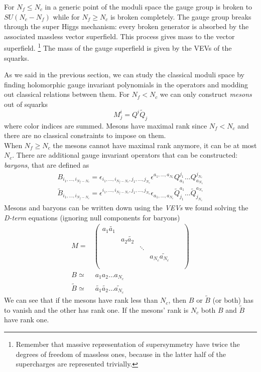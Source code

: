 For $N_f \le N_c$ in a generic point of the moduli space the gauge group is broken to $SU(N_c - N_f)$ while for $N_f \geq N_c$ is broken completely.
The gauge group breaks through the super Higgs mechanism: every broken generator is absorbed by the associated massless vector superfield.
This process gives mass to the vector superfield.  
\footnote{Remember that massive representation of supersymmetry have twice the degrees of freedom of massless ones, because in the latter half of the supercharges are represented trivially.}
The mass of the gauge superfield is given by the VEVs of the squarks.

As we said in the previous section, we can  study the classical moduli space by finding holomorphic gauge invariant polynomials in the operators and modding out classical relations between them.
For $N_f < N_c$ we can only construct \emph{mesons} out of squarks
\begin{equation}
  M^i_j = Q^i \tilde{Q}_j
 \end{equation} 
where color indices are summed. 
Mesons have maximal rank since $N_f < N_c$ and there are no  classical constraints to impose on them. \\
When $N_f \geq N_c$ the mesons cannot have maximal rank anymore, it can be at most $N_c$.
There are additional gauge invariant operators that can be constructed: \emph{baryons}, that are defined as
\begin{align}
 B_{ i_1, \dotsc, i_{N_f - N_c}} = \epsilon_{i_1, \dotsc, i_{N_f - N_c}, j_1 ,\dotsc, j_{N_c}} \epsilon^{a_1 , \dotsc, a_{N_c}} Q^{j_1}_{a_1} \dots Q^{j_{N_c}}_{a_{N_c}}
 \\
 \tilde{B}_{ i_1, \dotsc, i_{N_f - N_c}} = \epsilon^{i_1, \dotsc, i_{N_f - N_c}, j_1 , \dotsc, j_{N_c}} \epsilon_{a_1 , \dotsc, a_{N_c}} \tilde{Q}_{j_1}^{a_1} \dots \tilde{Q}_{j_{N_c}}^{a_{N_c}}
\end{align}
Mesons and baryons can be written down using the \emph{VEVs} we found solving the \emph{D-term} equations (ignoring null components for baryons)
\begin{align}
M =& \begin{pmatrix}
a_1 \tilde{a_1} & & & & & \\
				& a_2 \tilde{a_2}	& 		&		 & & \\
				&				 	& \ddots&		& 	& \\
				&					&		& a_{N_c} \tilde{a_{N_c}} & \\
				& & & & & \\	
\end{pmatrix}
\\
B  \simeq & \;  a_1 a_2 \dots a_{N_c} 
\\
\tilde{B} \simeq & \;  \tilde{a_1} \tilde{a_2}\dots \tilde{a_{N_c}}
\end{align}
We can see that if the mesons have rank less than $N_c$, then $B$ or $\tilde{B}$ (or both) has to vanish and the other has rank one. If the mesons' rank is $N_c$ both $B$ and $\tilde{B}$ have rank one.

